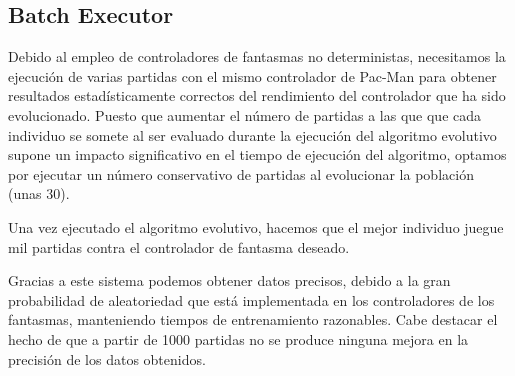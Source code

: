 \subsection{Batch Executor}
Debido al empleo de controladores de fantasmas no deterministas, necesitamos la ejecución de varias partidas con el mismo controlador de Pac-Man para obtener resultados estadísticamente correctos del rendimiento del controlador que ha sido evolucionado. Puesto que aumentar el número de partidas a las que que cada individuo se somete al ser evaluado durante la ejecución del algoritmo evolutivo supone un impacto significativo en el tiempo de ejecución del algoritmo, optamos por ejecutar un número conservativo de partidas al evolucionar la población (unas 30).
 
Una vez ejecutado el algoritmo evolutivo, hacemos que el  mejor individuo juegue mil partidas contra el controlador de fantasma deseado.
 
Gracias a este sistema podemos obtener datos precisos, debido a la gran probabilidad de aleatoriedad que está implementada en los controladores de los fantasmas, manteniendo tiempos de entrenamiento razonables. Cabe destacar el hecho de que a partir de 1000 partidas no se produce ninguna mejora en la precisión de los datos obtenidos.
